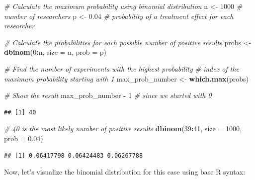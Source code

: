 \documentclass[
]{book}
\newenvironment{Shaded}{\begin{snugshade}}{\end{snugshade}}
\newcommand{\AttributeTok}[1]{\textcolor[rgb]{0.13,0.29,0.53}{#1}}
\newcommand{\CommentTok}[1]{\textcolor[rgb]{0.56,0.35,0.01}{\textit{#1}}}
\newcommand{\DecValTok}[1]{\textcolor[rgb]{0.00,0.00,0.81}{#1}}
\newcommand{\FloatTok}[1]{\textcolor[rgb]{0.00,0.00,0.81}{#1}}
\newcommand{\FunctionTok}[1]{\textcolor[rgb]{0.13,0.29,0.53}{\textbf{#1}}}
\newcommand{\NormalTok}[1]{#1}
\newcommand{\OtherTok}[1]{\textcolor[rgb]{0.56,0.35,0.01}{#1}}
\newcommand{\SpecialCharTok}[1]{\textcolor[rgb]{0.81,0.36,0.00}{\textbf{#1}}}
\begin{document}
\begin{Shaded}
\begin{Highlighting}[]
\CommentTok{\# Calculate the maximum probability using binomial distribution}
\NormalTok{n }\OtherTok{\textless{}{-}} \DecValTok{1000}  \CommentTok{\# number of researchers}
\NormalTok{p }\OtherTok{\textless{}{-}} \FloatTok{0.04}  \CommentTok{\# probability of a treatment effect for each researcher}

\CommentTok{\# Calculate the probabilities for each possible number of positive results}
\NormalTok{probs }\OtherTok{\textless{}{-}} \FunctionTok{dbinom}\NormalTok{(}\DecValTok{0}\SpecialCharTok{:}\NormalTok{n, }\AttributeTok{size =}\NormalTok{ n, }\AttributeTok{prob =}\NormalTok{ p)}

\CommentTok{\# Find the number of experiments with the highest probability}
\CommentTok{\# index of the maximum probability starting with 1}
\NormalTok{max\_prob\_number }\OtherTok{\textless{}{-}} \FunctionTok{which.max}\NormalTok{(probs)}

\CommentTok{\# Show the result}
\NormalTok{max\_prob\_number }\SpecialCharTok{{-}} \DecValTok{1} \CommentTok{\# since we started with 0}
\end{Highlighting}
\end{Shaded}

\begin{verbatim}
## [1] 40
\end{verbatim}

\begin{Shaded}
\begin{Highlighting}[]
\CommentTok{\# 40 is the most likely number of positive results}
\FunctionTok{dbinom}\NormalTok{(}\DecValTok{39}\SpecialCharTok{:}\DecValTok{41}\NormalTok{, }\AttributeTok{size =} \DecValTok{1000}\NormalTok{, }\AttributeTok{prob =} \FloatTok{0.04}\NormalTok{)}
\end{Highlighting}
\end{Shaded}

\begin{verbatim}
## [1] 0.06417798 0.06424483 0.06267788
\end{verbatim}

Now, let's visualize the binomial distribution for this case using base R syntax:
\end{document}
